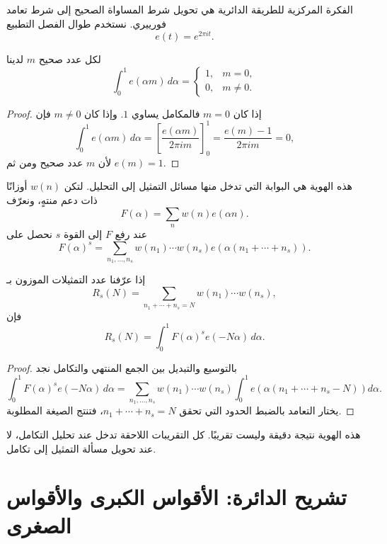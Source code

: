 الفكرة المركزية للطريقة الدائرية هي تحويل شرط المساواة الصحيح إلى شرط تعامد فورييري. نستخدم طوال الفصل التطبيع
\[
e(t)=e^{2\pi i t}.
\]

\begin{proposition}
\label{prop:circle-orthogonality}
لكل عدد صحيح $m$ لدينا
\[
\int_0^1 e(\alpha m)\,d\alpha
=
\begin{cases}
1,&m=0,\\
0,&m\ne0.
\end{cases}
\]
\provedhere
\end{proposition}

\begin{proof}
إذا كان $m=0$ فالمكامل يساوي $1$. وإذا كان $m\ne0$ فإن
\[
\int_0^1 e(\alpha m)\,d\alpha
=
\left[\frac{e(\alpha m)}{2\pi i m}\right]_{0}^{1}
=
\frac{e(m)-1}{2\pi i m}
=0,
\]
لأن $m$ عدد صحيح ومن ثم $e(m)=1$.
\end{proof}

هذه الهوية هي البوابة التي تدخل منها مسائل التمثيل إلى التحليل. لتكن $w(n)$ أوزانًا ذات دعم منتهٍ، ونعرّف
\[
F(\alpha)=\sum_n w(n)e(\alpha n).
\]
عند رفع $F$ إلى القوة $s$ نحصل على
\[
F(\alpha)^s
=
\sum_{n_1,\ldots,n_s}
 w(n_1)\cdots w(n_s)
 e\!\left(\alpha(n_1+\cdots+n_s)\right).
\]

\begin{theorem}
\label{thm:circle-representation-identity}
إذا عرّفنا عدد التمثيلات الموزون بـ
\[
R_s(N)
=
\sum_{n_1+\cdots+n_s=N}
 w(n_1)\cdots w(n_s),
\]
فإن
\[
R_s(N)
=
\int_0^1F(\alpha)^s e(-N\alpha)\,d\alpha.
\]
\provedhere
\end{theorem}

\begin{proof}
بالتوسيع والتبديل بين الجمع المنتهي والتكامل نجد
\[
\int_0^1F(\alpha)^s e(-N\alpha)\,d\alpha
=
\sum_{n_1,\ldots,n_s}
 w(n_1)\cdots w(n_s)
 \int_0^1
 e\!\left(\alpha(n_1+\cdots+n_s-N)\right)d\alpha.
\]
يختار التعامد بالضبط الحدود التي تحقق $n_1+\cdots+n_s=N$، فتنتج الصيغة المطلوبة.
\end{proof}

\begin{remark}
هذه الهوية نتيجة دقيقة وليست تقريبًا. كل التقريبات اللاحقة تدخل عند تحليل التكامل، لا عند تحويل مسألة التمثيل إلى تكامل.
\end{remark}

\section{تشريح الدائرة: الأقواس الكبرى والأقواس الصغرى}

